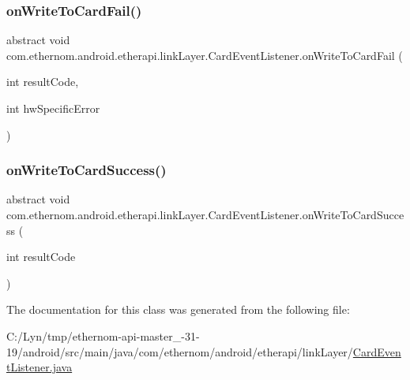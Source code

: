 \subsubsection{\texorpdfstring{on\+Write\+To\+Card\+Fail()}{onWriteToCardFail()}}
{\footnotesize\ttfamily abstract void com.\+ethernom.\+android.\+etherapi.\+link\+Layer.\+Card\+Event\+Listener.\+on\+Write\+To\+Card\+Fail (\begin{DoxyParamCaption}\item[{int}]{result\+Code,  }\item[{int}]{hw\+Specific\+Error }\end{DoxyParamCaption})\hspace{0.3cm}{\ttfamily [abstract]}}

\mbox{\label{classcom_1_1ethernom_1_1android_1_1etherapi_1_1link_layer_1_1_card_event_listener_a25f22cba82893eb625006927a184fc20}} 
\subsubsection{\texorpdfstring{on\+Write\+To\+Card\+Success()}{onWriteToCardSuccess()}}
{\footnotesize\ttfamily abstract void com.\+ethernom.\+android.\+etherapi.\+link\+Layer.\+Card\+Event\+Listener.\+on\+Write\+To\+Card\+Success (\begin{DoxyParamCaption}\item[{int}]{result\+Code }\end{DoxyParamCaption})\hspace{0.3cm}{\ttfamily [abstract]}}



The documentation for this class was generated from the following file\+:\begin{DoxyCompactItemize}
\item 
C\+:/\+Lyn/tmp/ethernom-\/api-\/master\+\_-\/31-\/19/android/src/main/java/com/ethernom/android/etherapi/link\+Layer/\mbox{\hyperlink{_card_event_listener_8java}{Card\+Event\+Listener.\+java}}\end{DoxyCompactItemize}
